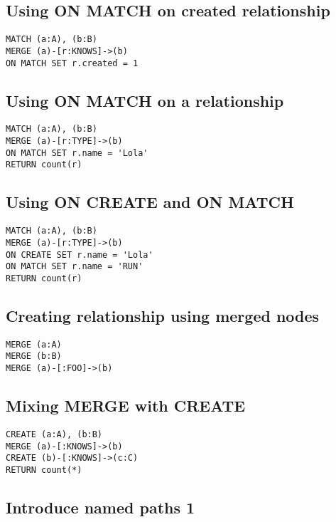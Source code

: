 \subsection{Using ON MATCH on created relationship}

\begin{lstlisting}
MATCH (a:A), (b:B)
MERGE (a)-[r:KNOWS]->(b)
ON MATCH SET r.created = 1
\end{lstlisting}

\subsection{Using ON MATCH on a relationship}

\begin{lstlisting}
MATCH (a:A), (b:B)
MERGE (a)-[r:TYPE]->(b)
ON MATCH SET r.name = 'Lola'
RETURN count(r)
\end{lstlisting}

\subsection{Using ON CREATE and ON MATCH}

\begin{lstlisting}
MATCH (a:A), (b:B)
MERGE (a)-[r:TYPE]->(b)
ON CREATE SET r.name = 'Lola'
ON MATCH SET r.name = 'RUN'
RETURN count(r)
\end{lstlisting}

\subsection{Creating relationship using merged nodes}

\begin{lstlisting}
MERGE (a:A)
MERGE (b:B)
MERGE (a)-[:FOO]->(b)
\end{lstlisting}

\subsection{Mixing MERGE with CREATE}

\begin{lstlisting}
CREATE (a:A), (b:B)
MERGE (a)-[:KNOWS]->(b)
CREATE (b)-[:KNOWS]->(c:C)
RETURN count(*)
\end{lstlisting}

\subsection{Introduce named paths 1}


